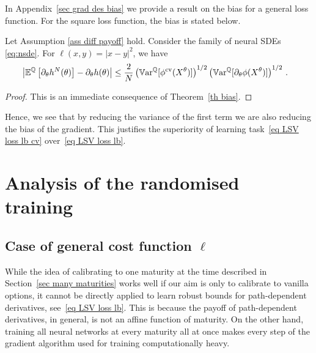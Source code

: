 In Appendix~\ref{sec grad des bias} we provide a result on the bias for a general loss function. 
For the square loss function, the bias is stated below. 

\begin{theorem}
\label{eq cor sq loss bias}
Let Assumption \ref{ass diff payoff} hold. Consider the family of neural SDEs \eqref{eq:nsde}. For $\ell(x,y)= |x - y|^{2}$, we have
\[
\begin{split}
 	&\left| \mathbb{E}^{\mathbb{Q}}\left[\partial_{\theta} h^{N}(\theta)\right] -  \partial_{\theta}h(\theta) \right|
 	  \leq  \frac{2}{N} \left(  \mathbb{V}\mathrm{ar}^{\mathbb{Q}}[\phi^{\textup{cv}}(X^{\theta})] \right)^{1/2} \left( \mathbb{V}\mathrm{ar}^{\mathbb{Q}}[\partial_{\theta}\phi(X^{\theta})]   \right)^{1/2}\,.
 \end{split}
\]
\end{theorem}
\begin{proof}
This is an immediate consequence of Theorem~\ref{th bias}.
\end{proof}


Hence, we see that by reducing the variance of the first term we are also reducing the bias of the gradient. This justifies the superiority of learning task~\eqref{eq LSV loss lb cv} over~\eqref{eq LSV loss lb}.


\section{Analysis of the randomised training}\label{sec random training}
\subsection{Case of general cost function $\ell$}

While the idea of calibrating to one maturity at the time described in Section~\ref{sec many maturities} works well if our aim is only to calibrate to vanilla options, it cannot be directly applied to learn robust bounds for path-dependent derivatives, see~\eqref{eq LSV loss lb}. This is because the payoff of path-dependent derivatives, in general, is not an affine function of maturity. On the other hand, training all neural networks at every maturity all at once makes every step of the gradient algorithm used for training computationally heavy. 

